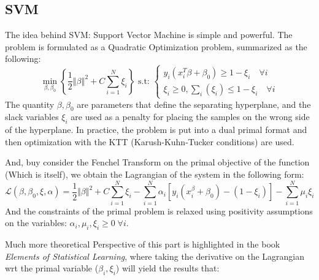 \documentclass{article}
\begin{document}
    \subsection*{SVM}
        \hspace{1.1em}
        The idea behind SVM: Support Vector Machine is simple and powerful. The problem is formulated as a Quadratic Optimization problem, summarized as the following: 
        \begin{equation*}\tag{6}\label{eqn:6}
            \min_{\beta, \beta_0} 
            \left\lbrace
            \frac{1}{2}
                \left\Vert
                    \beta
                \right\Vert^2
                + C \sum_{i = 1}^{N}\xi_i
            \right\rbrace
            \text{ s.t: } 
            \begin{cases}
                y_i(x_i^T\beta + \beta_0) \ge 1 - \xi_i \quad \forall i
                \\
                \xi_i \ge 0, \sum_{i}^{}\left(\xi_i\right) \le 1 - \xi_i \quad \forall i
            \end{cases}
        \end{equation*}
        The quantity $\beta, \beta_0$ are parameters that define the separating hyperplane, and the slack variables $\xi_i$ are used as a penalty for placing the samples on the wrong side of the hyperplane. In practice, the problem is put into a dual primal format and then optimization with the KTT (Karush-Kuhn-Tucker conditions) are used. 
        \par
        And, buy consider the Fenchel Transform on the primal objective of the function (Which is itself), we obtain the Lagrangian of the system in the following form:
        \begin{equation*}\tag{7}\label{eqn:7}
            \mathcal{L}(\beta, \beta_0, \xi, \alpha) = \frac{1}{2}\Vert \beta\Vert^2
            + 
            C \sum_{i = 1}^{N}\xi_i - 
            \sum_{i = 1}^{N}
                \alpha_i [y_i(x_i^\beta + \beta_0) - (1 - \xi_i)]
            - 
            \sum_{i = 1}^{N}\mu_i \xi_i
        \end{equation*}
        And the constraints of the primal problem is relaxed using positivity assumptions on the variables: $\alpha_i, \mu_i, \xi_i \ge 0 \;\forall i$. 
        \par
        Much more theoretical Perspective of this part is highlighted in the book \textit{Elements of Statistical Learning}, where taking the derivative on the Lagrangian wrt the primal variable ($\beta_i, \xi_i$) will yield the results that: 
\end{document}
